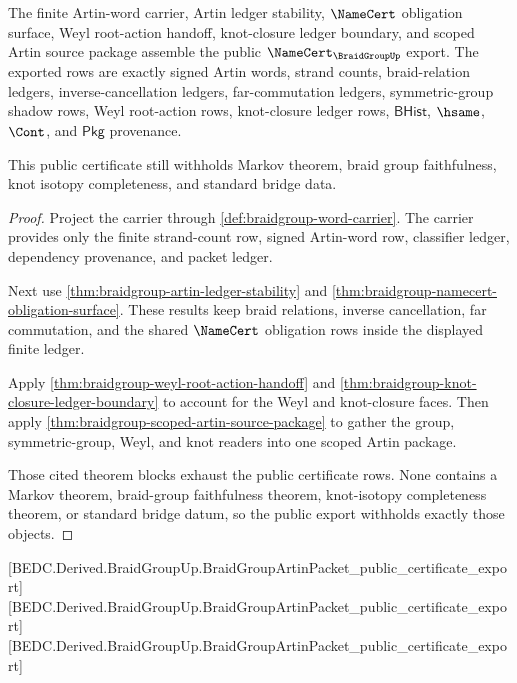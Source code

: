 \begin{theorem}
\label{thm:braidgroup-public-certificate-export}
The finite Artin-word carrier, Artin ledger stability, $\NameCert$ obligation
surface, Weyl root-action handoff, knot-closure ledger boundary, and scoped
Artin source package assemble the public $\NameCert_{\BraidGroupUp}$ export.
The exported rows are exactly signed Artin words, strand counts, braid-relation
ledgers, inverse-cancellation ledgers, far-commutation ledgers, symmetric-group
shadow rows, Weyl root-action rows, knot-closure ledger rows, $\mathsf{BHist}$,
$\hsame$, $\Cont$, and $\mathsf{Pkg}$ provenance.

This public certificate still withholds Markov theorem, braid group
faithfulness, knot isotopy completeness, and standard bridge data.
\end{theorem}
\begin{proof}
Project the carrier through \autoref{def:braidgroup-word-carrier}. The carrier
provides only the finite strand-count row, signed Artin-word row, classifier
ledger, dependency provenance, and packet ledger.

Next use \autoref{thm:braidgroup-artin-ledger-stability} and
\autoref{thm:braidgroup-namecert-obligation-surface}. These results keep braid
relations, inverse cancellation, far commutation, and the shared $\NameCert$
obligation rows inside the displayed finite ledger.

Apply \autoref{thm:braidgroup-weyl-root-action-handoff} and
\autoref{thm:braidgroup-knot-closure-ledger-boundary} to account for the Weyl
and knot-closure faces. Then apply
\autoref{thm:braidgroup-scoped-artin-source-package} to gather the group,
symmetric-group, Weyl, and knot readers into one scoped Artin package.

Those cited theorem blocks exhaust the public certificate rows. None contains a
Markov theorem, braid-group faithfulness theorem, knot-isotopy completeness
theorem, or standard bridge datum, so the public export withholds exactly those
objects.
\end{proof}

[BEDC.Derived.BraidGroupUp.BraidGroupArtinPacket\_public\_certificate\_export]
[BEDC.Derived.BraidGroupUp.BraidGroupArtinPacket\_public\_certificate\_export]
[BEDC.Derived.BraidGroupUp.BraidGroupArtinPacket\_public\_certificate\_export]


